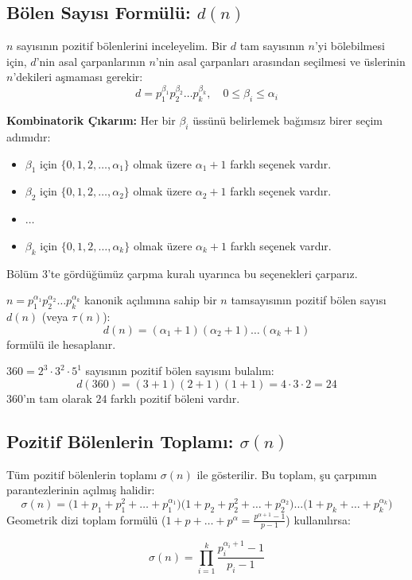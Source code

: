 \subsection{Bölen Sayısı Formülü: $d(n)$}

$n$ sayısının pozitif bölenlerini inceleyelim. Bir $d$ tam sayısının $n$'yi bölebilmesi için, $d$'nin asal çarpanlarının $n$'nin asal çarpanları arasından seçilmesi ve üslerinin $n$'dekileri aşmaması gerekir:
\[ d = p_1^{\beta_1} p_2^{\beta_2} \dots p_k^{\beta_k}, \quad 0 \le \beta_i \le \alpha_i \]

\textbf{Kombinatorik Çıkarım:}
Her bir $\beta_i$ üssünü belirlemek bağımsız birer seçim adımıdır:
\begin{itemize}
    \item $\beta_1$ için $\{0, 1, 2, \dots, \alpha_1\}$ olmak üzere $\alpha_1 + 1$ farklı seçenek vardır.
    \item $\beta_2$ için $\{0, 1, 2, \dots, \alpha_2\}$ olmak üzere $\alpha_2 + 1$ farklı seçenek vardır.
    \item $\dots$
    \item $\beta_k$ için $\{0, 1, 2, \dots, \alpha_k\}$ olmak üzere $\alpha_k + 1$ farklı seçenek vardır.
\end{itemize}
Bölüm 3'te gördüğümüz çarpma kuralı uyarınca bu seçenekleri çarparız.

\begin{theorem}
$n = p_1^{\alpha_1} p_2^{\alpha_2} \dots p_k^{\alpha_k}$ kanonik açılımına sahip bir $n$ tamsayısının pozitif bölen sayısı $d(n)$ (veya $\tau(n)$):
\[ d(n) = (\alpha_1 + 1)(\alpha_2 + 1)\dots(\alpha_k + 1) \]
formülü ile hesaplanır.
\end{theorem}

\begin{example}
$360 = 2^3 \cdot 3^2 \cdot 5^1$ sayısının pozitif bölen sayısını bulalım:
\[ d(360) = (3 + 1)(2 + 1)(1 + 1) = 4 \cdot 3 \cdot 2 = 24 \]
$360$'ın tam olarak $24$ farklı pozitif böleni vardır.
\end{example}

\subsection{Pozitif Bölenlerin Toplamı: $\sigma(n)$}

Tüm pozitif bölenlerin toplamı $\sigma(n)$ ile gösterilir. Bu toplam, şu çarpımın parantezlerinin açılmış halidir:
\[ \sigma(n) = \big(1 + p_1 + p_1^2 + \dots + p_1^{\alpha_1}\big) \big(1 + p_2 + p_2^2 + \dots + p_2^{\alpha_2}\big) \dots \big(1 + p_k + \dots + p_k^{\alpha_k}\big) \]
Geometrik dizi toplam formülü ($1 + p + \dots + p^\alpha = \frac{p^{\alpha+1} - 1}{p - 1}$) kullanılırsa:
\begin{theorem}
\[ \sigma(n) = \prod_{i=1}^k \frac{p_i^{\alpha_i + 1} - 1}{p_i - 1} \]
\end{theorem}


